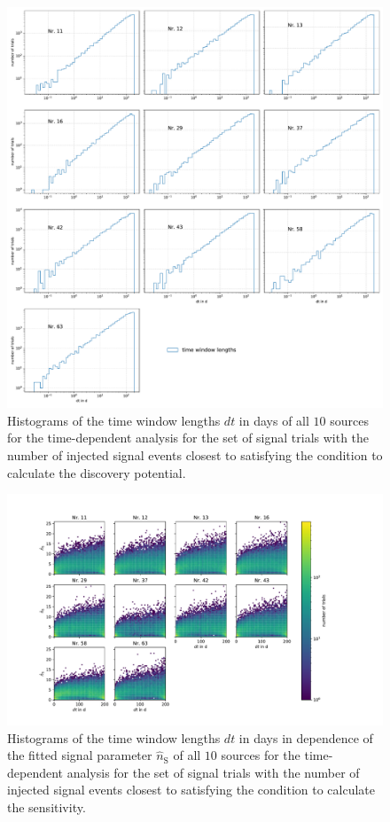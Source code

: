 \begin{figure}
    \centering
    \includegraphics[width=\linewidth]{Plots/appendix/9_years_gfu_gold_time_dep_disc_dt.pdf}
    \caption{Histograms of the time window lengths $dt$ in days of all $\num{10}$ sources for the time-dependent analysis for the set of signal trials with the number of injected signal events closest to satisfying the condition to calculate the discovery potential.}
    \label{fig:disc_dt_all}
\end{figure}

\begin{figure}
    \centering
    \includegraphics[width=\linewidth]{Plots/appendix/time_window_ns_sens_time_dep.pdf}
    \caption{Histograms of the time window lengths $dt$ in days in dependence of the fitted signal parameter $\hat{n}_\text{S}$ of all $\num{10}$ sources for the time-dependent analysis for the set of signal trials with the number of injected signal events closest to satisfying the condition to calculate the sensitivity.}
    \label{fig:sens_ns_dt_all}
\end{figure}

